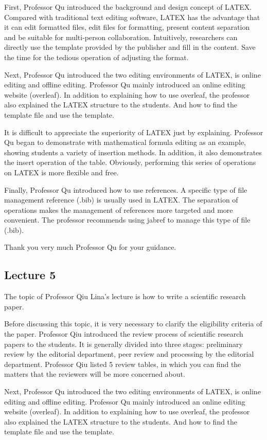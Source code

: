 \documentclass[UTF-8]{ctexart}
\begin{document}
First, Professor Qu introduced the background and design concept of LATEX. Compared with traditional text editing software, LATEX has the advantage that it can edit formatted files, edit files for formatting, present content separation and be suitable for multi-person collaboration. Intuitively, researchers can directly use the template provided by the publisher and fill in the content. Save the time for the tedious operation of adjusting the format.

Next, Professor Qu introduced the two editing environments of LATEX, is online editing and offline editing. Professor Qu mainly introduced an online editing website (overleaf). In addition to explaining how to use overleaf, the professor also explained the LATEX structure to the students. And how to find the template file and use the template.

It is difficult to appreciate the superiority of LATEX just by explaining. Professor Qu began to demonstrate with mathematical formula editing as an example, showing students a variety of insertion methods. In addition, it also demonstrates the insert operation of the table. Obviously, performing this series of operations on LATEX is more flexible and free.

Finally, Professor Qu introduced how to use references. A specific type of file management reference (.bib) is usually used in LATEX. The separation of operations makes the management of references more targeted and more convenient. The professor recommends using jabref to manage this type of file (.bib).

Thank you very much Professor Qu for your guidance.

\subsection{Lecture 5} 
The topic of Professor Qiu Lina's lecture is how to write a scientific research paper.

Before discussing this topic, it is very necessary to clarify the eligibility criteria of the paper. Professor Qiu introduced the review process of scientific research papers to the students. It is generally divided into three stages: preliminary review by the editorial department, peer review and processing by the editorial department. Professor Qiu listed 5 review tables, in which you can find the matters that the reviewers will be more concerned about.

Next, Professor Qu introduced the two editing environments of LATEX, is online editing and offline editing. Professor Qu mainly introduced an online editing website (overleaf). In addition to explaining how to use overleaf, the professor also explained the LATEX structure to the students. And how to find the template file and use the template.
\end{document}
